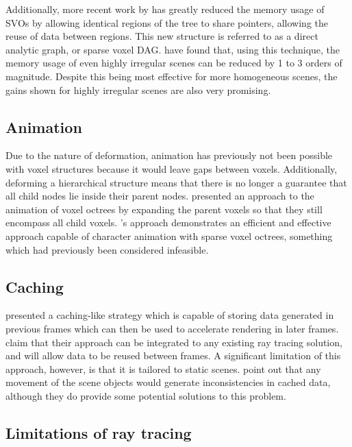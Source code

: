 Additionally, more recent work by \citeauthor{kampe2013dags} has greatly reduced the memory usage of SVOs by allowing identical regions of the tree to share pointers, allowing the reuse of data between regions. This new structure is referred to as a direct analytic graph, or sparse voxel DAG. \citeauthor{kampe2013dags} have found that, using this technique, the memory usage of even highly irregular scenes can be reduced by 1 to 3 orders of magnitude. Despite this being most effective for more homogeneous scenes, the gains shown for highly irregular scenes are also very promising.

\subsection{Animation}
Due to the nature of deformation, animation has previously not been possible with voxel structures because it would leave gaps between voxels. Additionally, deforming a hierarchical structure means that there is no longer a guarantee that all child nodes lie inside their parent nodes. \cite{bautembach2011animated} presented an approach to the animation of voxel octrees by expanding the parent voxels so that they still encompass all child voxels. \citeauthor{bautembach2011animated}'s approach demonstrates an efficient and effective approach capable of character animation with sparse voxel octrees, something which had previously been considered infeasible.

\subsection{Caching}
\cite{ruff13dynamiccaching} presented a caching-like strategy which is capable of storing data generated in previous frames which can then be used to accelerate rendering in later frames. \citeauthor{ruff13dynamiccaching} claim that their approach can be integrated to any existing ray tracing solution, and will allow data to be reused between frames. A significant limitation of this approach, however, is that it is tailored to static scenes. \citeauthor{ruff13dynamiccaching} point out that any movement of the scene objects would generate inconsistencies in cached data, although they do provide some potential solutions to this problem.

\subsection{Limitations of ray tracing}

